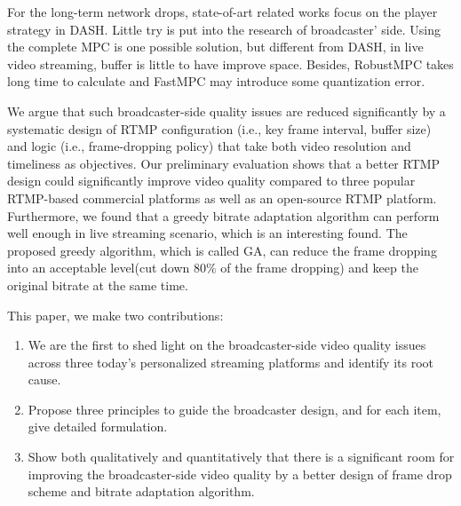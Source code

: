 For the long-term network drops, state-of-art related works focus on the player strategy in DASH. Little try is put into the research of broadcaster' side. Using the complete MPC is one possible solution, but different from DASH, in live video streaming, buffer is little to have improve space. Besides, RobustMPC takes long time to calculate and FastMPC may introduce some quantization error.

We argue that such broadcaster-side quality issues are reduced significantly
by a systematic design of RTMP configuration (i.e., key frame
interval, buffer size) and logic (i.e., frame-dropping policy) that take
both video resolution and timeliness as objectives.
Our preliminary evaluation shows that a better RTMP design
could significantly improve video quality compared to three popular
RTMP-based commercial  platforms as well as an open-source
RTMP platform.
Furthermore, we found that a greedy bitrate adaptation algorithm can perform well enough in live streaming scenario, which is an interesting found. 
The proposed greedy algorithm, which is called GA, can reduce the frame dropping into an acceptable level(cut down $80\%$ of the frame dropping) and keep the original bitrate at the same time.



This paper, we make two contributions:
\begin{enumerate}
\item We are the first to shed light on the broadcaster-side video quality issues across three today's personalized streaming platforms and identify its root cause.
\item Propose three principles to guide the broadcaster design, and for each item, give detailed formulation.
\item Show both qualitatively and quantitatively that there is a significant room for improving the broadcaster-side video quality by a better design of frame drop scheme and bitrate adaptation algorithm.

\end{enumerate}


